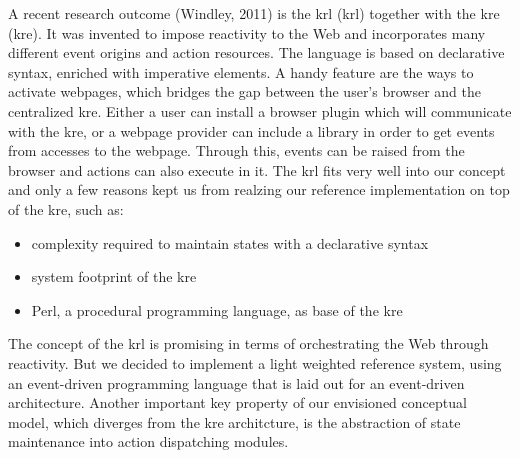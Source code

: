 A recent research outcome (Windley, 2011) is the \textrm{\acrlong{krl} (\acrshort{krl})}\cite{bookTheLiveWeb} together with the \textrm{\acrlong{kre} (\acrshort{kre})}.
It was invented to impose reactivity to the Web and incorporates many different event origins and action resources.
The language is based on declarative syntax, enriched with imperative elements.
A handy feature are the ways to activate webpages, which bridges the gap between the user's browser and the centralized \textrm{\acrshort{kre}}.
Either a user can install a browser plugin which will communicate with the \textrm{\acrshort{kre}}, or a webpage provider can include a library in order to get events from accesses to the webpage.
Through this, events can be raised from the browser and actions can also execute in it.
The \textrm{\acrshort{krl}} fits very well into our concept and only a few reasons kept us from realzing our reference implementation on top of the \textrm{\acrshort{kre}}, such as:
\begin{itemize}
  \item complexity required to maintain states with a declarative syntax 
  \item system footprint of the \textrm{\acrshort{kre}}
  \item \textrm{Perl}, a procedural programming language, as base of the \textrm{\acrshort{kre}}
\end{itemize}
The concept of the \textrm{\acrshort{krl}} is promising in terms of orchestrating the Web through reactivity.
But we decided to implement a light weighted reference system, using an event-driven programming language that is laid out for an event-driven architecture.
Another important key property of our envisioned conceptual model, which diverges from the \textrm{\acrshort{kre}} architcture, is the abstraction of state maintenance into action dispatching modules.

